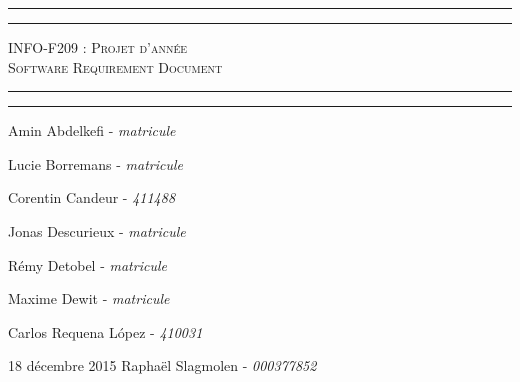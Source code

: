 \begin{titlepage}

\begin{center}
    \vspace*{\fill}
        \hrule
        \vspace*{2pt}
        \hrule
        \vspace*{15pt}
        \textsc{\Huge{INFO-F209 : Projet d'année \\\vspace*{8pt}
            Software Requirement Document}}
        \vspace*{15pt}
        \hrule
        \vspace*{2pt}
        \hrule
  \vspace*{\fill}
\end{center}
\null
\vfill

\hfill Amin Abdelkefi - \emph{matricule}

\hfill Lucie Borremans - \emph{matricule}

\hfill Corentin Candeur - \emph{411488}

\hfill Jonas Descurieux - \emph{matricule}

\hfill Rémy Detobel - \emph{matricule}

\hfill Maxime Dewit - \emph{matricule}

\hfill Carlos Requena López - \emph{410031}

\large 18 décembre 2015 \hfill Raphaël Slagmolen - \emph{000377852}

\end{titlepage}
